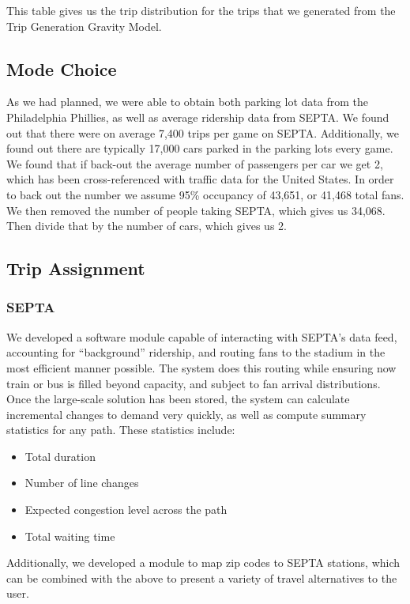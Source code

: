 This table gives us the trip distribution for the trips that we
generated from the Trip Generation Gravity Model.


\subsection{Mode Choice}

As we had planned, we were able to obtain both parking lot data from
the Philadelphia Phillies, as well as average ridership data from
SEPTA. We found out that there were on average 7,400 trips per game on
SEPTA. Additionally, we found out there are typically 17,000 cars
parked in the parking lots every game. We found that if back-out the
average number of passengers per car we get 2, which has been
cross-referenced with traffic data for the United States. In order to
back out the number we assume 95\% occupancy of 43,651, or 41,468
total fans. We then removed the number of people taking SEPTA, which
gives us 34,068. Then divide that by the number of cars, which gives
us 2.


\subsection{Trip Assignment}

\subsubsection{SEPTA}

We developed a software module capable of interacting with SEPTA's
data feed, accounting for ``background'' ridership, and routing fans
to the stadium in the most efficient manner possible. The system does
this routing while ensuring now train or bus is filled beyond
capacity, and subject to fan arrival distributions. Once the
large-scale solution has been stored, the system can calculate
incremental changes to demand very quickly, as well as compute summary
statistics for any path. These statistics include:

\begin{itemize}
  \item Total duration
  \item Number of line changes
  \item Expected congestion level across the path
  \item Total waiting time
\end{itemize}

Additionally, we developed a module to map zip codes to SEPTA
stations, which can be combined with the above to present a variety of
travel alternatives to the user.

